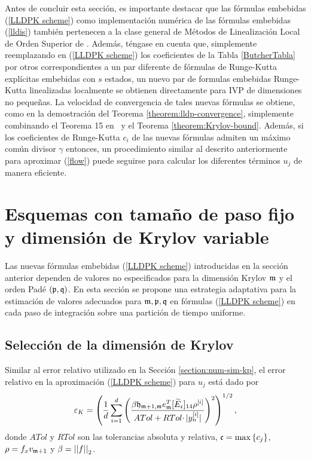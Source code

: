Antes de concluir esta sección, es importante destacar que las fórmulas embebidas (\ref{LLDPK scheme}) como implementación numérica de las fórmulas embebidas (\ref{lldis}) también pertenecen a la clase general de Métodos de Linealización Local de Orden Superior de \cite{Jimenez13}. Además, téngase en cuenta que, simplemente reemplazando en (\ref{LLDPK scheme}) los coeficientes de la Tabla \ref{ButcherTabla} por otros correspondientes a un par diferente de fórmulas de Runge-Kutta explícitas embebidas con $s$ estados, un nuevo par de formulas embebidas Runge-Kutta linealizadas localmente se obtienen directamente para IVP de dimensiones no pequeñas. La velocidad de convergencia de tales nuevas fórmulas se obtiene, como en la demostración del Teorema \ref{theorem:lldp-convergence}, simplemente combinando el Teorema 15 en~\cite{Jimenez13} y el Teorema \ref{theorem:Krylov-bound}. Además, si los coeficientes de Runge-Kutta $c_i$ de las nuevas fórmulas admiten un máximo común divisor $\gamma$ entonces, un procedimiento similar al descrito anteriormente para aproximar (\ref{flow}) puede seguirse para calcular los diferentes términos $u_j$ de manera eficiente.

\section{Esquemas con tamaño de paso fijo y dimensión de Krylov variable}\label{section:lldp-fix-step}

Las nuevas fórmulas embebidas (\ref{LLDPK scheme}) introducidas en la sección anterior dependen de valores no especificados para la dimensión Krylov $\mathfrak{m}$ y el orden Padé $(\mathfrak{p} ,\mathfrak{q})$. En esta sección se propone una estrategia adaptativa para la estimación de valores adecuados para $\mathfrak{m}, \mathfrak{p} ,\mathfrak{q}$ en fórmulas (\ref{LLDPK scheme}) en cada paso de integración sobre una partición de tiempo uniforme.

\subsection{Selección de la dimensión de Krylov}\label{sec:selkrydim}

Similar al error relativo utilizado en la Sección \ref{section:num-sim-kp}, el error relativo en la aproximación (\ref{LLDPK scheme}) para $u_j$ está dado por
\begin{equation}
    \varepsilon_{K} = \left(\frac{1}{d}\sum\limits_{i=1}^{d} \left(\frac{\beta
        \mathfrak{h}_{\mathfrak{m}+1,\mathfrak{m}} e_{\mathfrak{m}}^T
        [\widetilde{E}_\mathfrak{c}]_{14} \rho^{[i]}}{ATol+ RTol\cdotp
        \rvert y_{n}^{[i]}\rvert}\right)^{2}\right)^{1/2},
    \label{errrel}
\end{equation}
donde $ATol$ y $RTol$ son las tolerancias absoluta y relativa, $\mathfrak{c}=\max\left\{ c_j \right\}$, $\rho = f_x v_{\mathfrak{m}+1}$ y $\beta=\left\lvert \left\lvert f \right\rvert \right\rvert_2$.

